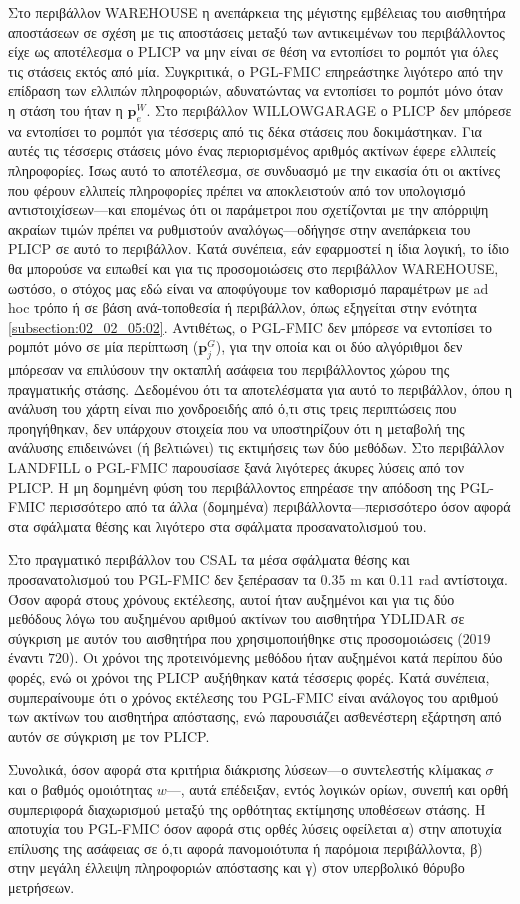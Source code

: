 Στο περιβάλλον WAREHOUSE η ανεπάρκεια της μέγιστης εμβέλειας του αισθητήρα
αποστάσεων σε σχέση με τις αποστάσεις μεταξύ των αντικειμένων του περιβάλλοντος
είχε ως αποτέλεσμα ο PLICP να μην είναι σε θέση να εντοπίσει το ρομπότ για όλες
τις στάσεις εκτός από μία. Συγκριτικά, ο PGL-FMIC επηρεάστηκε λιγότερο από την
επίδραση των ελλιπών πληροφοριών, αδυνατώντας να εντοπίσει το ρομπότ μόνο όταν
η στάση του ήταν η $\bm{p}_e^W$.  Στο περιβάλλον WILLOWGARAGE ο PLICP δεν
μπόρεσε να εντοπίσει το ρομπότ για τέσσερις από τις δέκα στάσεις που
δοκιμάστηκαν. Για αυτές τις τέσσερις στάσεις μόνο ένας περιορισμένος αριθμός
ακτίνων έφερε ελλιπείς πληροφορίες.  Ίσως αυτό το αποτέλεσμα, σε συνδυασμό με
την εικασία ότι οι ακτίνες που φέρουν ελλιπείς πληροφορίες πρέπει να
αποκλειστούν από τον υπολογισμό αντιστοιχίσεων---και επομένως ότι οι παράμετροι
που σχετίζονται με την απόρριψη ακραίων τιμών πρέπει να ρυθμιστούν
αναλόγως---οδήγησε στην ανεπάρκεια του PLICP σε αυτό το περιβάλλον. Κατά
συνέπεια, εάν εφαρμοστεί η ίδια λογική, το ίδιο θα μπορούσε να ειπωθεί και για
τις προσομοιώσεις στο περιβάλλον WAREHOUSE, ωστόσο, ο στόχος μας εδώ είναι να
αποφύγουμε τον καθορισμό παραμέτρων με ad hoc τρόπο ή σε βάση ανά-τοποθεσία ή
περιβάλλον, όπως εξηγείται στην ενότητα \ref{subsection:02_02_05:02}.
Αντιθέτως, ο PGL-FMIC δεν μπόρεσε να εντοπίσει το ρομπότ μόνο σε μία περίπτωση
($\bm{p}_j^G$), για την οποία και οι δύο αλγόριθμοι δεν μπόρεσαν να επιλύσουν
την οκταπλή ασάφεια του περιβάλλοντος χώρου της πραγματικής στάσης. Δεδομένου
ότι τα αποτελέσματα για αυτό το περιβάλλον, όπου η ανάλυση του χάρτη είναι πιο
χονδροειδής από ό,τι στις τρεις περιπτώσεις που προηγήθηκαν, δεν υπάρχουν
στοιχεία που να υποστηρίζουν ότι η μεταβολή της ανάλυσης επιδεινώνει (ή
βελτιώνει) τις εκτιμήσεις των δύο μεθόδων.  Στο περιβάλλον LANDFILL ο PGL-FMIC
παρουσίασε ξανά λιγότερες άκυρες λύσεις από τον PLICP.  Η μη δομημένη φύση του
περιβάλλοντος επηρέασε την απόδοση της PGL-FMIC περισσότερο από τα άλλα
(δομημένα) περιβάλλοντα---περισσότερο όσον αφορά στα σφάλματα θέσης και
λιγότερο στα σφάλματα προσανατολισμού του.

Στο πραγματικό περιβάλλον του CSAL τα μέσα σφάλματα θέσης και προσανατολισμού
του PGL-FMIC δεν ξεπέρασαν τα $0.35$ m και $0.11$ rad αντίστοιχα. Όσον
αφορά στους χρόνους εκτέλεσης, αυτοί ήταν αυξημένοι και για τις δύο
μεθόδους λόγω του αυξημένου αριθμού ακτίνων του αισθητήρα YDLIDAR
σε σύγκριση με αυτόν του αισθητήρα που χρησιμοποιήθηκε στις προσομοιώσεις
($2019$ έναντι $720$). Οι χρόνοι της προτεινόμενης μεθόδου ήταν αυξημένοι
κατά περίπου δύο φορές, ενώ οι χρόνοι της PLICP αυξήθηκαν κατά τέσσερις φορές.
Κατά συνέπεια, συμπεραίνουμε ότι ο χρόνος εκτέλεσης του PGL-FMIC είναι ανάλογος
του αριθμού των ακτίνων του αισθητήρα απόστασης, ενώ παρουσιάζει ασθενέστερη
εξάρτηση από αυτόν σε σύγκριση με τον PLICP.

Συνολικά, όσον αφορά στα κριτήρια διάκρισης λύσεων---ο συντελεστής κλίμακας
$\sigma$ και ο βαθμός ομοιότητας $w$---, αυτά επέδειξαν, εντός λογικών ορίων,
συνεπή και ορθή συμπεριφορά διαχωρισμού μεταξύ της ορθότητας εκτίμησης
υποθέσεων στάσης. Η αποτυχία του PGL-FMIC όσον αφορά στις ορθές λύσεις
οφείλεται α) στην αποτυχία επίλυσης της ασάφειας σε ό,τι αφορά πανομοιότυπα ή
παρόμοια περιβάλλοντα, β) στην μεγάλη έλλειψη πληροφοριών απόστασης και γ) στον
υπερβολικό θόρυβο μετρήσεων.
